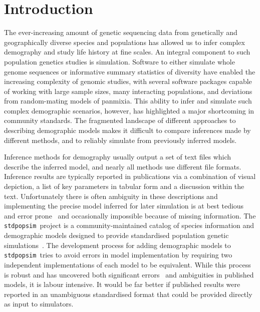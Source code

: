 \documentclass[11pt]{article}
\newcommand{\stdpopsim}[0]{\texttt{stdpopsim}}
\begin{document}
\section*{Introduction}

The ever-increasing amount of genetic sequencing data from genetically and
geographically diverse species and populations has allowed us to infer complex
demography and study life history at fine scales. An integral component to such
population genetics studies is simulation. Software to either simulate whole
genome sequences
\citep{thornton2014cpp,staab2015scrm,kelleher2016efficient,haller2019slim}
or informative summary statistics of diversity
\citep{gutenkunst2009inferring,kamm2017efficient,jouganous2017inferring} have
enabled the increasing complexity of genomic studies, with several software
packages capable of working with large sample sizes, many interacting populations, and
deviations from random-mating models of panmixia.
This ability to infer and simulate such complex demographic scenarios, however,
has highlighted a major shortcoming in community standards. The fragmented
landscape of different approaches to describing demographic models makes
it difficult to compare inferences made by different methods,
and to reliably simulate from previously inferred models.

Inference methods for demography usually output a set of
text files which describe the inferred model,
and nearly all methods use different file formats.
Inference results are typically reported in publications
via a combination of visual depiction,
a list of key parameters in tabular form and a discussion within the text.
Unfortunately there is often ambiguity in these descriptions and
implementing the precise model inferred for later simulation
is at best tedious and error prone~\citep{ragsdale2020lessons}
and occasionally impossible because of missing information.
The \stdpopsim\ project is a community-maintained catalog of species
information and demographic models designed to provide standardised
population genetic simulations~\citep{adrion2020community}.
The development process for adding demographic models to
\stdpopsim\ tries to avoid errors in model implementation by requiring two
independent implementations of each model
to be equivalent. While this process is
robust and has uncovered both significant
errors~\citep{ragsdale2020lessons} and ambiguities in
published models, it is labour intensive.
It would be far better if published results
were reported in an unambiguous standardised format that could be provided
directly as input to simulators.
\end{document}
